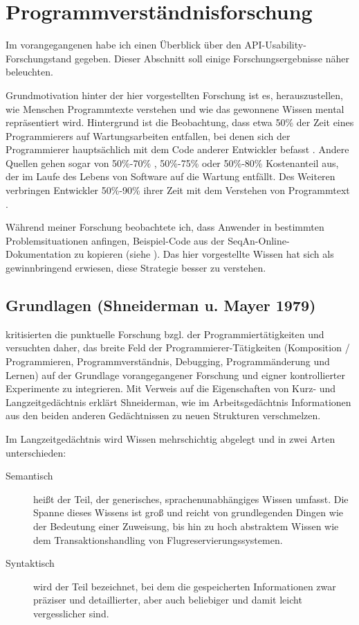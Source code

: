 \section{Programmverständnisforschung}
\label{sec:programmverstandnisforschung}

Im vorangegangenen  habe ich einen Überblick über den API-Usability-Forschungstand gegeben. Dieser Abschnitt soll einige Forschungsergebnisse näher beleuchten.

Grundmotivation hinter der hier vorgestellten Forschung ist es, herauszustellen, wie Menschen Programmtexte verstehen und wie das gewonnene Wissen mental repräsentiert wird. Hintergrund ist die Beobachtung, dass etwa 50\% der Zeit eines Programmierers auf Wartungsarbeiten entfallen, bei denen sich der Programmierer  hauptsächlich mit dem Code anderer Entwickler befasst \citep{Pennington:1987dc}. Andere Quellen gehen sogar von 50\%-70\% \citep{Layzell:fv}, 50\%-75\% \citep{Boehm:du} oder 50\%-80\% \citep{Shaft:1998tc} Kostenanteil aus, der im Laufe des Lebens von Software auf die Wartung entfällt. Des Weiteren verbringen Entwickler 50\%-90\% ihrer Zeit mit dem Verstehen von Programmtext \citep{Shaft:1998tc}. 

Während meiner Forschung beobachtete ich, dass Anwender in bestimmten Problemsituationen anfingen, Beispiel-Code aus der SeqAn-Online-Dokumentation zu kopieren (siehe ). Das hier vorgestellte Wissen hat sich als gewinnbringend erwiesen, diese Strategie besser zu verstehen. 

\subsection{Grundlagen (Shneiderman u. Mayer 1979)}

\cite{BenShneiderman:gn} kritisierten die punktuelle Forschung bzgl. der Programmiertätigkeiten und versuchten daher, das breite Feld der Programmierer-Tätigkeiten (Komposition / Programmieren, Programmverständnis, Debugging, Programmänderung und Lernen) auf der Grundlage vorangegangener Forschung und eigner kontrollierter Experimente zu integrieren. Mit Verweis auf die Eigenschaften von Kurz- und Langzeitgedächtnis erklärt Shneiderman, wie im Arbeitsgedächtnis Informationen aus den beiden anderen Gedächtnissen zu neuen Strukturen verschmelzen.

Im Langzeitgedächtnis wird Wissen mehrschichtig abgelegt und in zwei Arten unterschieden:
\begin{description}
\item[Semantisch]
heißt der Teil, der generisches, sprachenunabhängiges Wissen umfasst. Die Spanne dieses Wissens ist groß und reicht von grundlegenden Dingen wie der Bedeutung einer Zuweisung, bis hin zu hoch abstraktem Wissen wie dem Transaktionshandling von Flugreservierungssystemen.
\item[Syntaktisch]
wird der Teil bezeichnet, bei dem die gespeicherten Informationen zwar präziser und detaillierter, aber auch beliebiger und damit leicht vergesslicher sind.
\end{description}

